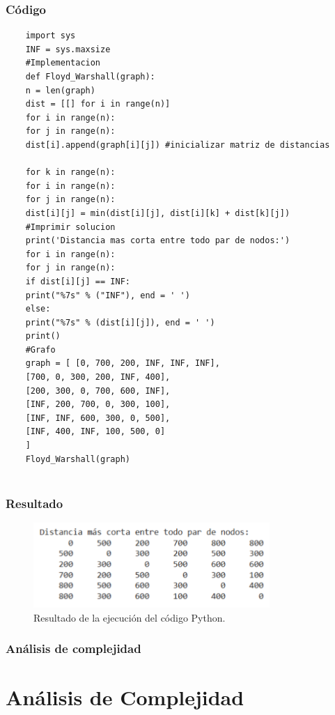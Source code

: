 \subsubsection{Código}
\begin{lstlisting}
	import sys
	INF = sys.maxsize
	#Implementacion
	def Floyd_Warshall(graph):
	n = len(graph)
	dist = [[] for i in range(n)]
	for i in range(n):
	for j in range(n):
	dist[i].append(graph[i][j]) #inicializar matriz de distancias
	
	for k in range(n):
	for i in range(n):
	for j in range(n):
	dist[i][j] = min(dist[i][j], dist[i][k] + dist[k][j])
	#Imprimir solucion
	print('Distancia mas corta entre todo par de nodos:')
	for i in range(n):
	for j in range(n):
	if dist[i][j] == INF:
	print("%7s" % ("INF"), end = ' ')
	else:
	print("%7s" % (dist[i][j]), end = ' ')
	print()
	#Grafo
	graph = [ [0, 700, 200, INF, INF, INF],
	[700, 0, 300, 200, INF, 400],
	[200, 300, 0, 700, 600, INF],
	[INF, 200, 700, 0, 300, 100],
	[INF, INF, 600, 300, 0, 500],
	[INF, 400, INF, 100, 500, 0]
	]
	Floyd_Warshall(graph)
	
\end{lstlisting}

\subsubsection{Resultado}
\begin{figure}[H]
	\centering
	\includegraphics[width=0.8\textwidth]{resultado_distancias_ejem1.png}
	\caption{Resultado de la ejecución del código Python.}
	\label{fig:resultado}
\end{figure}

\subsubsection{Análisis de complejidad}

\section*{Análisis de Complejidad}

